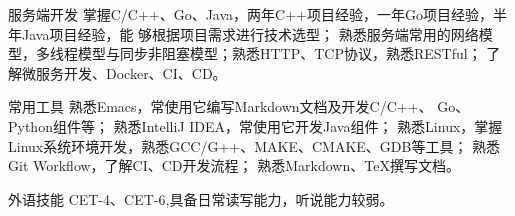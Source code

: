 

\begin{cvskills}

  \cvskill
    {服务端开发} %
    {
      掌握C/C++、Go、Java，两年C++项目经验，一年Go项目经验，半年Java项目经验，能
      够根据项目需求进行技术选型；
      熟悉服务端常用的网络模型，多线程模型与同步非阻塞模型；熟悉HTTP、TCP协议，熟悉RESTful；
      了解微服务开发、Docker、CI、CD。
    } %

  \cvskill
    {常用工具} %
    {
      熟悉Emacs，常使用它编写Markdown文档及开发C/C++、
      Go、Python组件等；
      熟悉IntelliJ IDEA，常使用它开发Java组件；
      熟悉Linux，掌握Linux系统环境开发，熟悉GCC/G++、MAKE、CMAKE、GDB等工具；
      熟悉Git Workflow，了解CI、CD开发流程；
      熟悉Markdown、\TeX{}撰写文档。
    } %


  \cvskill
    {外语技能} %
    {CET-4、CET-6,具备日常读写能力，听说能力较弱。} %

\end{cvskills}
